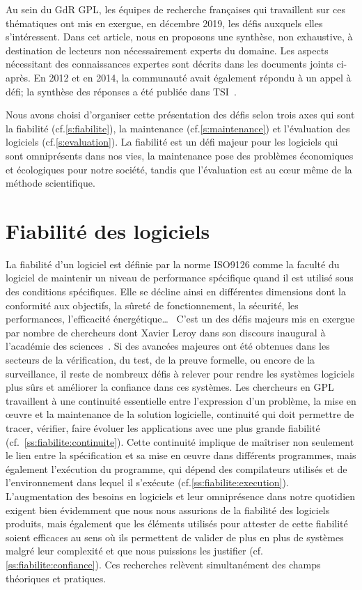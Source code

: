 \documentclass[11pt]{article}
\newcommand{\GDR}{GdR\xspace}
\newcommand{\cf}[0]{cf.\xspace}
\begin{document}
Au sein du {\GDR} GPL, les équipes de recherche françaises qui travaillent sur ces thématiques ont mis en exergue, en décembre 2019, les défis auxquels elles s'intéressent. Dans cet article, nous en proposons une synthèse, non exhaustive, à destination de lecteurs non nécessairement experts du domaine. Les aspects %
nécessitant des connaissances expertes sont décrits dans les documents joints ci-après. En 2012 et en 2014, la communauté avait également répondu à un appel à défi; la synthèse des réponses a  été publiée dans TSI~\cite{collet:hal-01345654, duchien:hal-00712942}.


Nous avons choisi d'organiser cette présentation des défis selon trois axes qui sont la fiabilité (\cf\ref{s:fiabilite}), la maintenance (\cf\ref{s:maintenance}) et l'évaluation des logiciels (\cf\ref{s:evaluation}). La fiabilité est un défi majeur pour les logiciels qui sont omniprésents dans nos vies, la maintenance pose des problèmes économiques et écologiques pour notre société, tandis que l'évaluation est au c{\oe}ur même de la méthode scientifique.

\section{Fiabilité des logiciels\label{s:fiabilite}}

La fiabilité d'un logiciel est définie par la norme ISO9126 comme la faculté du logiciel de maintenir un niveau de performance spécifique quand il est utilisé sous des conditions spécifiques. Elle se décline ainsi en différentes dimensions dont la conformité aux objectifs, la sûreté de fonctionnement, la sécurité, les performances, l'efficacité énergétique\ldots~
C'est un des défis majeurs mis en exergue par nombre de chercheurs dont Xavier Leroy dans son discours inaugural à l'académie des sciences~\cite{leroy:hal-02370113}. Si des avancées majeures ont été obtenues dans les secteurs de la vérification, du test, de la preuve formelle, ou encore de la surveillance, il reste de nombreux défis à relever pour rendre les systèmes logiciels plus sûrs et améliorer la confiance dans ces systèmes. 
Les chercheurs en GPL travaillent à une continuité essentielle entre l'expression d'un problème, la mise en {\oe}uvre et la maintenance de la solution logicielle, continuité qui doit permettre de tracer, vérifier, faire évoluer les applications avec une plus grande fiabilité (cf.~\ref{ss:fiabilite:continuite}). Cette continuité implique de maîtriser non seulement le lien entre la spécification et sa mise en  {\oe}uvre dans différents  programmes, mais également l'exécution du programme, qui dépend des compilateurs utilisés et de l'environnement dans lequel il s'exécute (\cf\ref{ss:fiabilite:execution}). 
L'augmentation des besoins en logiciels et leur omniprésence dans notre quotidien exigent bien évidemment que nous nous assurions de la fiabilité des logiciels produits, mais également que les éléments utilisés pour attester de cette fiabilité soient efficaces au sens où ils permettent de valider de plus en plus de systèmes malgré leur complexité et  que nous puissions les justifier (\cf\ref{ss:fiabilite:confiance}).
Ces recherches relèvent simultanément des champs théoriques et pratiques.
\end{document}
